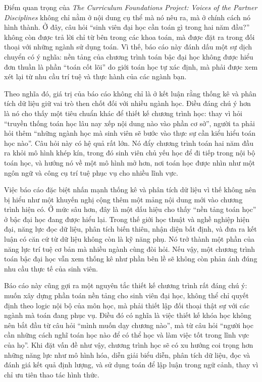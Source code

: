 \documentclass[
  10pt,
  a4paper,
  landscape,
  twoside,
  openany
]{scrbook}
\newcommand{\NOTE}[1]{#1}
\begin{document}
{
\NOTE{Điểm quan trọng của \emph{The Curriculum Foundations Project: Voices of the Partner Disciplines} không chỉ nằm ở nội dung cụ thể mà nó nêu ra, mà ở chính cách nó hình thành. Ở đây, câu hỏi “sinh viên đại học cần toán gì trong hai năm đầu?” không còn được trả lời chỉ từ bên trong các khoa toán, mà được đặt ra trong đối thoại với những ngành sử dụng toán. Vì thế, báo cáo này đánh dấu một sự dịch chuyển có ý nghĩa: nền tảng của chương trình toán bậc đại học không được hiểu đơn thuần là phần “toán cốt lõi” do giới toán học tự xác định, mà phải được xem xét lại từ nhu cầu trí tuệ và thực hành của các ngành bạn.

Theo nghĩa đó, giá trị của báo cáo không chỉ là ở kết luận rằng thống kê và phân tích dữ liệu giữ vai trò then chốt đối với nhiều ngành học. Điều đáng chú ý hơn là nó cho thấy một tiêu chuẩn khác để thiết kế chương trình học: thay vì hỏi “truyền thống toán học lâu nay xếp nội dung nào vào phần cơ sở”, người ta phải hỏi thêm “những ngành học mà sinh viên sẽ bước vào thực sự cần kiểu hiểu toán học nào”. Câu hỏi này có hệ quả rất lớn. Nó đẩy chương trình toán hai năm đầu ra khỏi mô hình khép kín, trong đó sinh viên chủ yếu học để đi tiếp trong nội bộ toán học, và hướng nó về một mô hình mở hơn, nơi toán học được nhìn như một ngôn ngữ và công cụ trí tuệ phục vụ cho nhiều lĩnh vực.

Việc báo cáo đặc biệt nhấn mạnh thống kê và phân tích dữ liệu vì thế không nên bị hiểu như một khuyến nghị cộng thêm một mảng nội dung mới vào chương trình hiện có. Ở mức sâu hơn, đây là một dấu hiệu cho thấy “nền tảng toán học” ở bậc đại học đang được hiểu lại. Trong thế giới học thuật và nghề nghiệp hiện đại, năng lực đọc dữ liệu, phân tích biến thiên, nhận diện bất định, và đưa ra kết luận có căn cứ từ dữ liệu không còn là kỹ năng phụ. Nó trở thành một phần của năng lực trí tuệ cơ bản mà nhiều ngành cùng đòi hỏi. Nếu vậy, một chương trình toán bậc đại học vẫn xem thống kê như phần bên lề sẽ không còn phản ánh đúng nhu cầu thực tế của sinh viên.

Báo cáo này cũng gợi ra một nguyên tắc thiết kế chương trình rất đáng chú ý: muốn xây dựng phần toán nền tảng cho sinh viên đại học, không thể chỉ quyết định theo logic nội bộ của môn học, mà phải thiết lập đối thoại thật sự với các ngành mà toán đang phục vụ. Điều đó có nghĩa là việc thiết kế khóa học không nên bắt đầu từ câu hỏi ``mình muốn dạy chương nào'', mà từ câu hỏi ``người học cần những cách nghĩ toán học nào để có thể học và làm việc tốt trong lĩnh vực của họ''. Khi đặt vấn đề như vậy, chương trình học sẽ có xu hướng coi trọng hơn những năng lực như mô hình hóa, diễn giải biểu diễn, phân tích dữ liệu, đọc và đánh giá kết quả định lượng, và sử dụng toán để lập luận trong ngữ cảnh, thay vì chỉ ưu tiên thao tác hình thức.

}}
\end{document}
